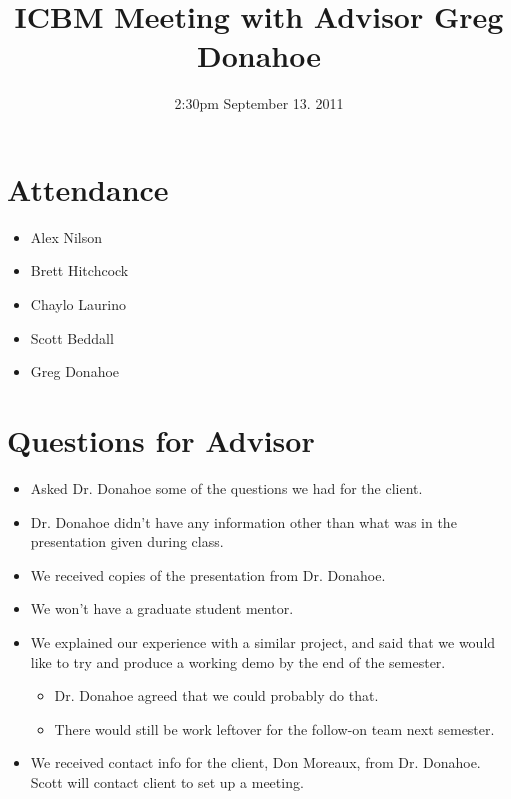 \documentclass{article}
\begin{document}
\title{ICBM Meeting with Advisor Greg Donahoe}
\date{2:30pm September 13. 2011}
\maketitle

\section{Attendance}
\begin{itemize}
\item Alex Nilson
\item Brett Hitchcock
\item Chaylo Laurino
\item Scott Beddall
\item Greg Donahoe
\end{itemize}

\section{Questions for Advisor}
\begin{itemize}
\item Asked Dr. Donahoe some of the questions we had for the client.
\item Dr. Donahoe didn't have any information other than what was in the presentation given during class.
\item We received copies of the presentation from Dr. Donahoe.
\item We won't have a graduate student mentor.
\item We explained our experience with a similar project, and said that we would like to try and produce a working demo by the end of the semester.
	\begin{itemize}
	\item Dr. Donahoe agreed that we could probably do that.
	\item There would still be work leftover for the follow-on team next semester.
	\end{itemize}
\item We received contact info for the client, Don Moreaux, from Dr. Donahoe.  Scott will contact client to set up a meeting.
\end{itemize}
\end{document}
